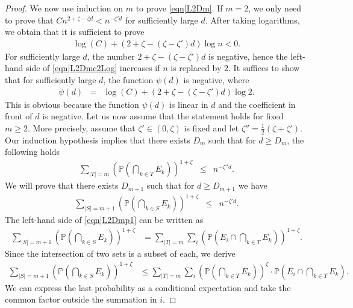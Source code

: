 \documentclass[reqno]{amsart}
\begin{document}
\begin{proof}
We now use induction on $m$ to prove \eqref{eqn|L2Dm}. If $m=2$, we only need to prove that 
$ Cn^{2+\zeta-\zeta d}<n^{-\zeta'd}$ for sufficiently large $d$. After taking logarithms, we obtain that it is sufficient to prove 
\begin{eqnarray}\log(C)+(2+\zeta-(\zeta-\zeta') d)\log n< 0. \label{eqn|L2Dmc2Log}
\end{eqnarray}
For sufficiently large $d$, the number $2+\zeta-(\zeta-\zeta')d$ is negative, hence the left-hand side of \eqref{eqn|L2Dmc2Log} increases if $n$ is replaced by $2$. It suffices to show that for sufficiently large $d$, the function $\psi(d)$ is negative, where 
\begin{eqnarray*}
\psi(d)&=&\log(C)+(2+\zeta-(\zeta-\zeta') d)\log 2.
\end{eqnarray*}
This is obvious because the function $\psi(d)$ is linear in $d$ and the coefficient in front of $d$ is negative. 
Let us now assume that the statement holds for fixed $m\geq 2$. 
More precisely, assume that $\zeta'\in(0,\zeta)$ is fixed and let $\zeta''=\frac12(\zeta+\zeta')$. Our induction hypothesis implies that there exists $D_m$ such that for $d\geq D_m$, the following holds 
\begin{eqnarray}
\sum_{|T|=m} \left(\mathbb P\left(\bigcap_{k\in T}E_k\right)\right)^{1+\zeta}&\leq& n^{-\zeta''d}.
\label{eqn|L2DmIH}
\end{eqnarray}
We will prove that there exists $D_{m+1}$ such that 
for $d\geq D_{m+1}$ we have
\begin{eqnarray}
\sum_{|S|=m+1} \left(\mathbb P\left(\bigcap_{k\in S}E_k\right)\right)^{1+\zeta}&\leq& n^{-\zeta'd}. \label{eqn|L2Dmp1}
\end{eqnarray}
The left-hand side of \eqref{eqn|L2Dmp1} can be written as 
\begin{align*}
\sum_{|S|=m+1} \left(\mathbb P\left(\bigcap_{k\in S}E_k\right)\right)^{1+\zeta}&=
\sum_{|T|=m}\sum_i \left(\mathbb P\left(E_i\cap \bigcap_{k\in T}E_k\right)\right)^{1+\zeta}.\end{align*}
Since the intersection of two sets is a subset of each, we derive
\begin{align*}
\sum_{|S|=m+1} \left(\mathbb P\left(\bigcap_{k\in S}E_k\right)\right)^{1+\zeta}&\leq \sum_{|T|=m}\sum_i \left(\mathbb P\left(\bigcap_{k\in T}E_k\right)\right)^{\zeta}\cdot \mathbb P\left(E_i\cap \bigcap_{k\in T}E_k\right).\end{align*}
We can express the last probability as a conditional expectation and take the common factor outside the summation in $i$.  

\end{proof}
\end{document}
